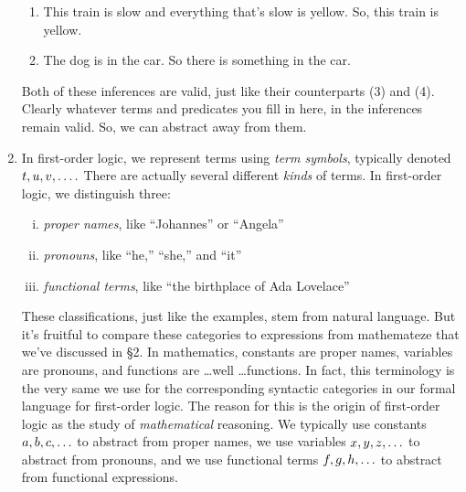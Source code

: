 \begin{enumerate}[\thesection.1]
\begin{enumerate}[(1')]
		\item This train is slow and everything that's slow is yellow. So, this train is yellow.
		
		\item The dog is in the car. So there is something in the car.
	
	\end{enumerate}
Both of these inferences are valid, just like their counterparts (3) and (4). Clearly whatever  terms and predicates you fill in here, in the inferences remain valid. So, we can abstract away from them.

		\item In first-order logic, we represent terms using \emph{term symbols}, typically denoted $t,u,v,\mathellipsis.$ There are actually several different \emph{kinds} of terms. In first-order logic, we distinguish three:
		\begin{enumerate}[(i)]
		
			\item \emph{proper names}, like ``Johannes'' or ``Angela''
			
			\item \emph{pronouns}, like ``he,'' ``she,'' and ``it''
			
			\item \emph{functional terms}, like ``the birthplace of Ada Lovelace''
		
		\end{enumerate}
These classifications, just like the examples, stem from natural language. But it's fruitful to compare these categories to expressions from mathemateze that we've discussed in \S2. In mathematics, constants are proper names, variables are pronouns, and functions are \dots well \dots functions. In fact, this terminology is the very same we use for the corresponding syntactic categories in our formal language for first-order logic. The reason for this is the origin of first-order logic as the study of \emph{mathematical} reasoning. We typically use constants $a,b,c,\mathellipsis$ to abstract from proper names, we use variables $x,y,z,\mathellipsis$ to abstract from pronouns, and we use functional terms $f,g,h,\mathellipsis$ to abstract from functional expressions.


\end{enumerate}
